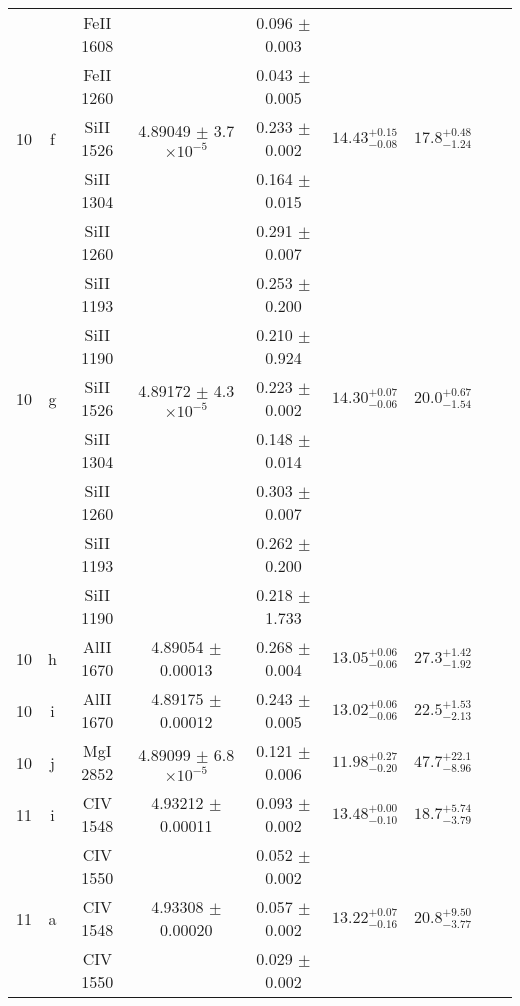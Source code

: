 \documentclass[12pt]{article}
\begin{document}
\begin{footnotesize}
\begin{longtable}{ c c c c c c c c c}
  &   & FeII     1608  &  &  0.096 $\pm$ 0.003   &   &     & 	 & \\ 
  &   & FeII     1260  &  &  0.043 $\pm$ 0.005   &   &     & 	 & \\ 
      10  & f  & SiII     1526  &  4.89049 $\pm$ 3.7 $\times 10^{-5}$   &  0.233 $\pm$ 0.002   & $14.43_{ - 0.08}^{ + 0.15}$  & $17.8_{ - 1.24}^{ + 0.48}$    & 	 & \\ 
  &   & SiII     1304  &  &  0.164 $\pm$ 0.015   &   &     & 	 & \\ 
  &   & SiII     1260  &  &  0.291 $\pm$ 0.007   &   &     & 	 & \\ 
  &   & SiII     1193  &  &  0.253 $\pm$ 0.200   &   &     & 	 & \\ 
  &   & SiII     1190  &  &  0.210 $\pm$ 0.924   &   &     & 	 & \\ 
      10  & g  & SiII     1526  &  4.89172 $\pm$ 4.3 $\times 10^{-5}$   &  0.223 $\pm$ 0.002   & $14.30_{ - 0.06}^{ + 0.07}$  & $20.0_{ - 1.54}^{ + 0.67}$    & 	 & \\ 
  &   & SiII     1304  &  &  0.148 $\pm$ 0.014   &   &     & 	 & \\ 
  &   & SiII     1260  &  &  0.303 $\pm$ 0.007   &   &     & 	 & \\ 
  &   & SiII     1193  &  &  0.262 $\pm$ 0.200   &   &     & 	 & \\ 
  &   & SiII     1190  &  &  0.218 $\pm$ 1.733   &   &     & 	 & \\ 
      10  & h  & AlII     1670  &  4.89054 $\pm$ 0.00013  &  0.268 $\pm$ 0.004   & $13.05_{ - 0.06}^{ + 0.06}$  & $27.3_{ - 1.92}^{ + 1.42}$    & 	 & \\ 
      10  & i  & AlII     1670  &  4.89175 $\pm$ 0.00012  &  0.243 $\pm$ 0.005   & $13.02_{ - 0.06}^{ + 0.06}$  & $22.5_{ - 2.13}^{ + 1.53}$    & 	 & \\ 
      10  & j  & MgI     2852  &  4.89099 $\pm$ 6.8 $\times 10^{-5}$   &  0.121 $\pm$ 0.006   & $11.98_{ - 0.20}^{ + 0.27}$  & $47.7_{ - 8.96}^{ + 22.1}$    & 	 & \\ 
      11  & i  & CIV     1548  &  4.93212 $\pm$ 0.00011  &  0.093 $\pm$ 0.002   & $13.48_{ - 0.10}^{ + 0.00}$  & $18.7_{ - 3.79}^{ + 5.74}$    & 	 & \\ 
  &   & CIV     1550  &  &  0.052 $\pm$ 0.002   &   &     & 	 & \\ 
      11  & a  & CIV     1548  &  4.93308 $\pm$ 0.00020  &  0.057 $\pm$ 0.002   & $13.22_{ - 0.16}^{ + 0.07}$  & $20.8_{ - 3.77}^{ + 9.50}$    & 	 & \\ 
  &   & CIV     1550  &  &  0.029 $\pm$ 0.002   &   &     & 	 & \\ 

\end{longtable}
\end{footnotesize}
\end{document}

